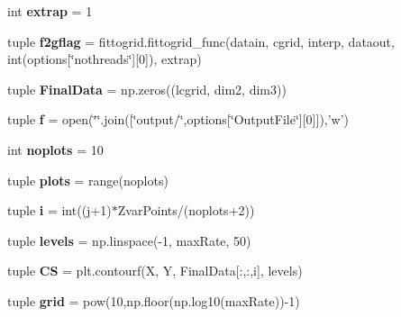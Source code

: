 \begin{DoxyCompactItemize}
\item 
\hypertarget{namespacechemtable__io_ad4360a854a9d14cc2bb0053bcfea8d8b}{
int {\bfseries extrap} = 1}
\label{dc/dad/namespacechemtable__io_ad4360a854a9d14cc2bb0053bcfea8d8b}

\item 
\hypertarget{namespacechemtable__io_aebb2536447762fe0d750ce9dce0320fb}{
tuple {\bfseries f2gflag} = fittogrid.fittogrid\_\-func(datain, cgrid, interp, dataout, int(options\mbox{[}\char`\"{}nothreads\char`\"{}\mbox{]}\mbox{[}0\mbox{]}), extrap)}
\label{dc/dad/namespacechemtable__io_aebb2536447762fe0d750ce9dce0320fb}

\item 
\hypertarget{namespacechemtable__io_a02dc114f1a179390eef0fe4af078d69a}{
tuple {\bfseries FinalData} = np.zeros((lcgrid, dim2, dim3))}
\label{dc/dad/namespacechemtable__io_a02dc114f1a179390eef0fe4af078d69a}

\item 
\hypertarget{namespacechemtable__io_a27d4f591166067031bd4b1e6b2fc75a8}{
tuple {\bfseries f} = open(\char`\"{}\char`\"{}.join(\mbox{[}\char`\"{}output/\char`\"{},options\mbox{[}\char`\"{}OutputFile\char`\"{}\mbox{]}\mbox{[}0\mbox{]}\mbox{]}),'w')}
\label{dc/dad/namespacechemtable__io_a27d4f591166067031bd4b1e6b2fc75a8}

\item 
\hypertarget{namespacechemtable__io_abdc8c4c92f2b49066d5985de88b16401}{
int {\bfseries noplots} = 10}
\label{dc/dad/namespacechemtable__io_abdc8c4c92f2b49066d5985de88b16401}

\item 
\hypertarget{namespacechemtable__io_a58c8972afa870559ea0911a5345d1aaf}{
tuple {\bfseries plots} = range(noplots)}
\label{dc/dad/namespacechemtable__io_a58c8972afa870559ea0911a5345d1aaf}

\item 
\hypertarget{namespacechemtable__io_a8a26635410eccb46e2d8bbece82c32e4}{
tuple {\bfseries i} = int((j+1)$\ast$ZvarPoints/(noplots+2))}
\label{dc/dad/namespacechemtable__io_a8a26635410eccb46e2d8bbece82c32e4}

\item 
\hypertarget{namespacechemtable__io_ae59c0bcc8fc88059fb5f524c7acb3f91}{
tuple {\bfseries levels} = np.linspace(-\/1, maxRate, 50)}
\label{dc/dad/namespacechemtable__io_ae59c0bcc8fc88059fb5f524c7acb3f91}

\item 
\hypertarget{namespacechemtable__io_adecebbc128c05d6ff3ea00c70ba7920d}{
tuple {\bfseries CS} = plt.contourf(X, Y, FinalData\mbox{[}:,:,i\mbox{]}, levels)}
\label{dc/dad/namespacechemtable__io_adecebbc128c05d6ff3ea00c70ba7920d}

\item 
\hypertarget{namespacechemtable__io_a2608ae90b335459dc5b2f5ca4d619929}{
tuple {\bfseries grid} = pow(10,np.floor(np.log10(maxRate))-\/1)}
\label{dc/dad/namespacechemtable__io_a2608ae90b335459dc5b2f5ca4d619929}

\end{DoxyCompactItemize}



